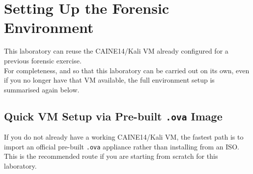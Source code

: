 \section{Setting Up the Forensic Environment}

This laboratory can reuse the CAINE14/Kali VM already configured for a previous forensic exercise. \\
For completeness, and so that this laboratory can be carried out on its own, even if you no longer have that VM available, the full environment setup is summarised again below.

\subsection{Quick VM Setup via Pre-built \texttt{.ova} Image}

If you do not already have a working CAINE14/Kali VM, the fastest path is to import an official
pre-built \texttt{.ova} appliance rather than installing from an ISO. This is the recommended
route if you are starting from scratch for this laboratory.

